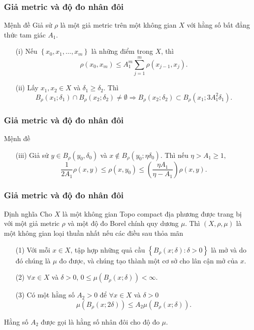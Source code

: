 \documentclass[11pt]{beamer}
\numberwithin{equation}{section}
\theoremstyle{plain}
\theoremstyle{definition}
\theoremstyle{remark}
\begin{document}
\begin{frame}\frametitle{Giả metric và độ đo nhân đôi}
\begin{block}{Mệnh đề}
Giả sử $\rho$ là một giả metric trên một không gian $X$ với hằng số bất đẳng thức tam giác $A_{1}$.
\begin{itemize}
\item[(i)] Nếu $\left\{x_{0},x_{1},\ldots,x_{m}\right\}$ là những điểm trong $X$, thì 
\[\rho \left( {{x_0},{x_m}} \right) \le A_1^m\sum\limits_{j = 1}^m {\rho \left( {{x_{j - 1}},{x_j}} \right)} .\]
\item[(ii)] Lấy $x_{1},x_{2}\in X$ và $\delta_{1}\geqslant\delta_{2}. $ Thì
\[{B_\rho }\left( {{x_1};{\delta _1}} \right) \cap {B_\rho }\left( {{x_2};{\delta _2}} \right) \ne \emptyset  \Rightarrow {B_\rho }\left( {{x_2};{\delta _2}} \right) \subset {B_\rho }\left( {{x_1};3A_1^2{\delta _1}} \right).\]
\end{itemize}
\end{block}
\end{frame}
\begin{frame}\frametitle{Giả metric và độ đo nhân đôi}
\begin{block}{Mệnh đề}
\begin{itemize}
\item[(iii)] Giả sử $y\in B_{\rho}\left(y_{0},\delta_{0}\right)$ và $x\notin B_{\rho}\left(y_{0};\eta\delta_{0}\right).$ Thì nếu $\eta>A_{1}\geqslant1,$
\[\frac{1}{{2{A_1}}}\rho \left( {x,y} \right) \le \rho \left( {x,{y_0}} \right) \le \left( {\frac{{\eta {A_1}}}{{\eta  - {A_1}}}} \right)\rho \left( {x,y} \right).\]
\end{itemize}
\end{block}
\end{frame}
\begin{frame}\frametitle{Giả metric và độ đo nhân đôi}
\begin{block}{Định nghĩa}
Cho $X$ là một không gian Topo compact địa phương được trang bị với một giả metric $\rho$ và một độ đo Borel chính quy dương $\mu$. Thì $\left(X,\rho,\mu\right)$ là một không gian loại thuần nhất nếu các điều sau thỏa mãn
\begin{itemize}
\item[(1)] Với mỗi $x\in X$, tập hợp những quả cầu $\left\{B_{\rho}\left(x;\delta\right):\delta>0\right\}$ là mở và do đó chúng là $\mu$ đo được, và chúng tạo thành một cơ sở cho lân cận mở của $x$.
\item[(2)] $\forall x\in X$ và $\delta>0$, $0\le \mu\left(B_{\rho}\left(x;\delta\right)\right)<\infty.$
\item[(3)] Có một hằng số $A_{2}>0$ để $\forall x\in X$ và $\delta>0$
\[\mu\left(B_{\rho}\left(x;2\delta\right)\right)\le A_{2}\mu\left(B_{\rho}\left(x;\delta\right)\right).\] 
\end{itemize}
Hằng số $A_{2}$ được gọi là hằng số nhân đôi cho độ đo $\mu$.
\end{block}
\end{frame}
\end{document}
